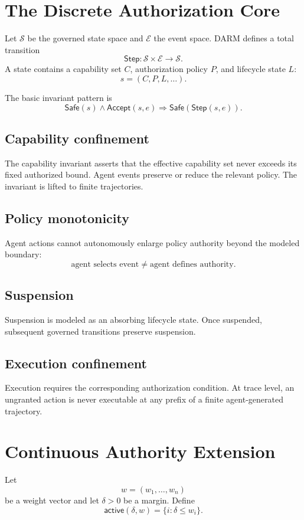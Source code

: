 \documentclass[11pt]{article}
\begin{document}
\section{The Discrete Authorization Core}
Let $\mathcal{S}$ be the governed state space and $\mathcal{E}$ the event space. DARM defines a total transition
\[
\mathsf{Step}:\mathcal{S}\times\mathcal{E}\rightarrow\mathcal{S}.
\]
A state contains a capability set $C$, authorization policy $P$, and lifecycle state $L$:
\[
s=(C,P,L,\ldots).
\]

The basic invariant pattern is
\[
\mathsf{Safe}(s)\land\mathsf{Accept}(s,e)
\Longrightarrow
\mathsf{Safe}(\mathsf{Step}(s,e)).
\]

\subsection{Capability confinement}
The capability invariant asserts that the effective capability set never exceeds its fixed authorized bound. Agent events preserve or reduce the relevant policy. The invariant is lifted to finite trajectories.

\subsection{Policy monotonicity}
Agent actions cannot autonomously enlarge policy authority beyond the modeled boundary:
\[
\text{agent selects event}\neq\text{agent defines authority}.
\]

\subsection{Suspension}
Suspension is modeled as an absorbing lifecycle state. Once suspended, subsequent governed transitions preserve suspension.

\subsection{Execution confinement}
Execution requires the corresponding authorization condition. At trace level, an ungranted action is never executable at any prefix of a finite agent-generated trajectory.

\section{Continuous Authority Extension}
Let
\[
w=(w_1,\ldots,w_n)
\]
be a weight vector and let $\delta>0$ be a margin. Define
\[
\mathsf{active}(\delta,w)=\{i:\delta\leq w_i\}.
\]
\end{document}
